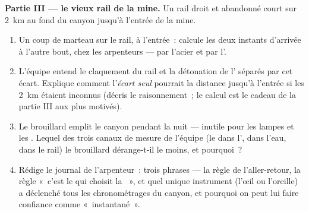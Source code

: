 \begin{problem}
\medskip\noindent\textbf{Partie III --- le vieux rail de la mine.}
Un rail droit et abandonné court sur \qty{2}{km} au fond du canyon
jusqu'à l'entrée de la mine.
\begin{enumerate}[resume]
  \item Un coup de marteau sur le rail, à l'entrée~: calcule les
        deux instants d'arrivée à l'autre bout, chez les
        arpenteurs --- par l'acier et par l'.
  \item L'équipe entend le claquement du rail et la détonation de
        l' séparés par cet écart. Explique comment l'\emph{écart
        seul} pourrait  la distance jusqu'à l'entrée si les
        \qty{2}{km} étaient inconnus (décris le raisonnement~; le
        calcul est le cadeau de la partie III aux plus motivés).
  \item Le brouillard emplit le canyon pendant la nuit --- inutile
        pour les lampes et les . Lequel des trois canaux de
        mesure de l'équipe (le  dans l', dans l'eau, dans le
        rail) le brouillard dérange-t-il le moins, et pourquoi~?
  \item Rédige le journal de l'arpenteur~: trois phrases --- la
        règle de l'aller-retour, la règle «~c'est le  qui
        choisit la ~», et quel unique instrument (l'œil ou
        l'oreille) a déclenché tous les chronométrages du canyon,
        et pourquoi on peut lui faire confiance comme
        «~instantané~».
\end{enumerate}
\end{problem}
